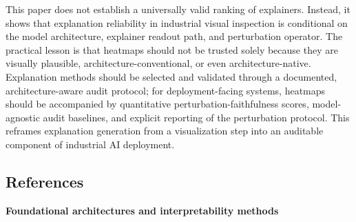 \documentclass[11pt,a4paper]{article}
\begin{document}
This paper does not establish a universally valid ranking of explainers. Instead, it shows that explanation reliability in industrial visual inspection is conditional on the model architecture, explainer readout path, and perturbation operator. The practical lesson is that heatmaps should not be trusted solely because they are visually plausible, architecture-conventional, or even architecture-native. Explanation methods should be selected and validated through a documented, architecture-aware audit protocol; for deployment-facing systems, heatmaps should be accompanied by quantitative perturbation-faithfulness scores, model-agnostic audit baselines, and explicit reporting of the perturbation protocol. This reframes explanation generation from a visualization step into an auditable component of industrial AI deployment.

\subsection*{References}

\textbf{Foundational architectures and interpretability methods}
\end{document}
